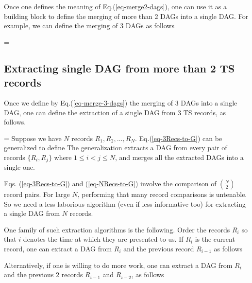 \documentclass[12pt]{article}
\begin{document}
\beq
{}
\label{eq-merge2-dags}
\eeq
Once one defines the meaning of 
Eq.(\ref{eq-merge2-dags}), 
one can use it as a building block
to define the merging of more than 2 
DAGs into a single DAG. For example,
we can define the merging of 3 DAGs as 
follows

\beq
{}\quad =\quad
{}
\label{eq-merge-3-dags}
\eeq

\subsection{
Extracting single DAG from more than 2 TS records}

Once we define 
by Eq.(\ref{eq-merge-3-dags})
the merging
of 3 DAGs into a
single DAG,
one can define the 
extraction of a single DAG from 3 TS records, as follows.

\beq
{}
=
\label{eq-3Recs-to-G}
\eeq
Suppose  we have $N$ records $R_1, R_2, \ldots,R_N$. Eq.(\ref{eq-3Recs-to-G})
can be generalized to define
\beq
{}
\label{eq-NRecs-to-G}
\eeq
The generalization 
extracts a DAG from every pair of 
records $\{R_i, R_j\}$ where $1\leq i< j\leq N$, and merges all the  
extracted DAGs into a single one.

Eqs. (\ref{eq-3Recs-to-G})
and (\ref{eq-NRecs-to-G})
involve the comparison of $N\choose 2$
record pairs. For large $N$,
performing that many record comparisons
is untenable.
So we need a less laborious
algorithm (even if less informative too) for extracting
a single DAG from $N$  records.

One family of such extraction algorithms
is the following. Order the records $R_i$
so that $i$ denotes the time at
which  they 
are presented to us. If $R_i$ is the
current record,
one can extract a DAG from $R_i$ 
and the previous record $R_{i-1}$ as 
follows

\beq
{}
\eeq
Alternatively, if one
is willing to do more work,
one can extract a DAG from 
$R_i$ and the previous 2 records 
$R_{i-1}$ and $R_{i-2}$, as follows
\end{document}
